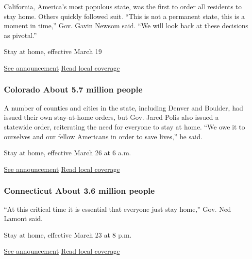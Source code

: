 California, America's most populous state, was the first to order all
residents to stay home. Others quickly followed suit. ``This is not a
permanent state, this is a moment in time,'' Gov. Gavin Newsom said.
``We will look back at these decisions as pivotal.''

Stay at home, effective March 19

\href{https://covid19.ca.gov/img/Executive-Order-N-33-20.pdf}{See
announcement} \textbar{}
\href{https://www.latimes.com/california/story/2020-03-20/coronavirus-and-california-landmarks-empty-and-surreal}{Read
local coverage}

\hypertarget{colorado-about-57-million-people}{%
\subsubsection{Colorado About 5.7 million
people}\label{colorado-about-57-million-people}}

A number of counties and cities in the state, including Denver and
Boulder, had issued their own stay-at-home orders, but Gov. Jared Polis
also issued a statewide order, reiterating the need for everyone to stay
at home. ``We owe it to ourselves and our fellow Americans in order to
save lives,'' he said.

Stay at home, effective March 26 at 6 a.m.

\href{https://twitter.com/GovofCO/status/1242943191394877441?s=20}{See
announcement} \textbar{}
\href{https://gazette.com/news/colorado-stay-at-home-order-issued-by-gov-polis-wednesday/article_7b3e0834-6ed7-11ea-84db-678f7b49011f.html}{Read
local coverage}

\hypertarget{connecticut-about-36-million-people}{%
\subsubsection{Connecticut About 3.6 million
people}\label{connecticut-about-36-million-people}}

``At this critical time it is essential that everyone just stay home,''
Gov. Ned Lamont said.

Stay at home, effective March 23 at 8 p.m.

\href{https://portal.ct.gov/Office-of-the-Governor/News/Press-Releases/2020/03-2020/Governor-Lamont-Signs-Executive-Order-Asking-Connecticut-Businesses-and-Residents-Stay-Safe}{See
announcement} \textbar{}
\href{https://www.courant.com/coronavirus/hc-news-coronavirus-update-0320-20200320-m5oro7ss3vb3nlqsormcmt6nty-story.html}{Read
local coverage}

